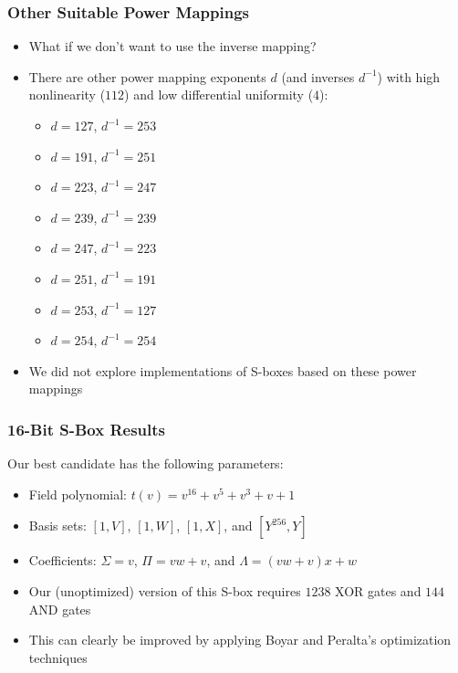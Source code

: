 \documentclass[handout,10pt]{beamer}
\begin{document}
\begin{frame}
	\frametitle{Other Suitable Power Mappings}
	\begin{itemize}
		\item What if we don't want to use the inverse mapping?
		\item There are other power mapping exponents $d$ (and inverses $d^{-1}$) with high nonlinearity ($112$) and low differential uniformity ($4$):
		\begin{itemize}
			\itemsep0em
			\item $d = 127$, $d^{-1} = 253$
			\item $d = 191$, $d^{-1} = 251$
			\item $d = 223$, $d^{-1} = 247$
			\item $d = 239$, $d^{-1} = 239$
			\item $d = 247$, $d^{-1} = 223$
			\item $d = 251$, $d^{-1} = 191$
			\item $d = 253$, $d^{-1} = 127$
			\item $d = 254$, $d^{-1} = 254$
		\end{itemize}
		\item We did not explore implementations of S-boxes based on these power mappings
	\end{itemize}
\end{frame}

\begin{frame}
	\frametitle{16-Bit S-Box Results}
	Our best candidate has the following parameters:
	\begin{itemize}
		\item Field polynomial: $t(v) = v^{16} + v^5 + v^3 + v + 1$
		\item Basis sets: $[1, V]$, $[1, W]$, $[1, X]$, and $[Y^{256}, Y]$
		\item Coefficients: $\Sigma = v$, $\Pi = vw + v$, and $\Lambda = (vw + v)x + w$
	\end{itemize}

	\begin{itemize}
		\item Our (unoptimized) version of this S-box requires $1238$ XOR gates and $144$ AND gates 
		\item This can clearly be improved by applying Boyar and Peralta's optimization techniques
	\end{itemize}
\end{frame}
\end{document}
